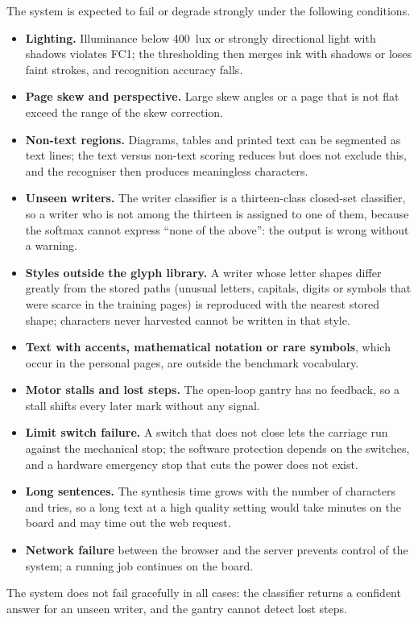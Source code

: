         The system is expected to fail or degrade strongly under the following conditions.
        \begin{itemize}
          \item \textbf{Lighting.} Illuminance below 400~lux or strongly directional light with shadows violates FC1; the thresholding then merges ink with shadows or loses faint strokes, and recognition accuracy falls.
          \item \textbf{Page skew and perspective.} Large skew angles or a page that is not flat exceed the range of the skew correction.
          \item \textbf{Non-text regions.} Diagrams, tables and printed text can be segmented as text lines; the text versus non-text scoring reduces but does not exclude this, and the recogniser then produces meaningless characters.
          \item \textbf{Unseen writers.} The writer classifier is a thirteen-class closed-set classifier, so a writer who is not among the thirteen is assigned to one of them, because the softmax cannot express ``none of the above'': the output is wrong without a warning.
          \item \textbf{Styles outside the glyph library.} A writer whose letter shapes differ greatly from the stored paths (unusual letters, capitals, digits or symbols that were scarce in the training pages) is reproduced with the nearest stored shape; characters never harvested cannot be written in that style.
          \item \textbf{Text with accents, mathematical notation or rare symbols}, which occur in the personal pages, are outside the benchmark vocabulary.
          \item \textbf{Motor stalls and lost steps.} The open-loop gantry has no feedback, so a stall shifts every later mark without any signal.
          \item \textbf{Limit switch failure.} A switch that does not close lets the carriage run against the mechanical stop; the software protection depends on the switches, and a hardware emergency stop that cuts the power does not exist.
          \item \textbf{Long sentences.} The synthesis time grows with the number of characters and tries, so a long text at a high quality setting would take minutes on the board and may time out the web request.
          \item \textbf{Network failure} between the browser and the server prevents control of the system; a running job continues on the board.
        \end{itemize}
        The system does not fail gracefully in all cases: the classifier returns a confident answer for an unseen writer, and the gantry cannot detect lost steps.

